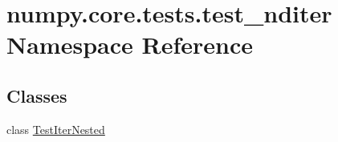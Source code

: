 \hypertarget{namespacenumpy_1_1core_1_1tests_1_1test__nditer}{}\section{numpy.\+core.\+tests.\+test\+\_\+nditer Namespace Reference}
\label{namespacenumpy_1_1core_1_1tests_1_1test__nditer}
\subsection*{Classes}
\begin{DoxyCompactItemize}
\item 
class \hyperlink{classnumpy_1_1core_1_1tests_1_1test__nditer_1_1TestIterNested}{Test\+Iter\+Nested}
\end{DoxyCompactItemize}
